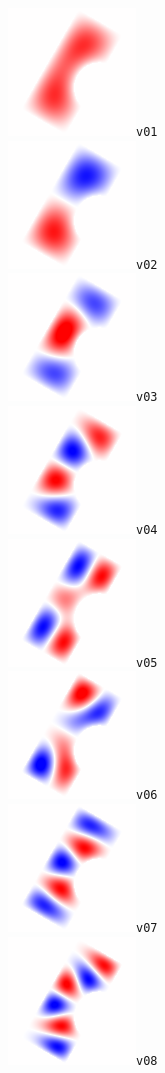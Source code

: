 \documentclass[a4paper,11pt]{article}
\begin{document}
\includegraphics[width=0.15\linewidth]{f/marimba_v01.png}\verb+v01+\\
\includegraphics[width=0.15\linewidth]{f/marimba_v02.png}\verb+v02+\\
\includegraphics[width=0.15\linewidth]{f/marimba_v03.png}\verb+v03+\\
\includegraphics[width=0.15\linewidth]{f/marimba_v04.png}\verb+v04+\\
\includegraphics[width=0.15\linewidth]{f/marimba_v05.png}\verb+v05+\\
\includegraphics[width=0.15\linewidth]{f/marimba_v06.png}\verb+v06+\\
\includegraphics[width=0.15\linewidth]{f/marimba_v07.png}\verb+v07+\\
\includegraphics[width=0.15\linewidth]{f/marimba_v08.png}\verb+v08+\\
\end{document}
